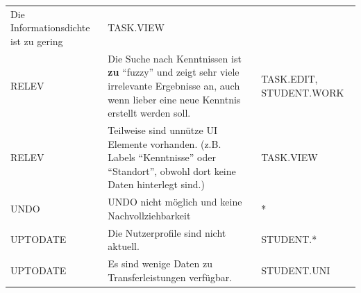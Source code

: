 \documentclass[
  12pt,
  ngerman,
  a4paper,
]{article}
\begin{document}
\begin{longtable}[]{@{}lll@{}}
\begin{minipage}[t]{0.55\columnwidth}
Die Informationsdichte ist zu gering\strut
\end{minipage} & \begin{minipage}[t]{0.23\columnwidth}\raggedright
TASK.VIEW\strut
\end{minipage}\tabularnewline
\begin{minipage}[t]{0.14\columnwidth}\raggedright
RELEV\strut
\end{minipage} & \begin{minipage}[t]{0.55\columnwidth}\raggedright
Die Suche nach Kenntnissen ist \textbf{zu} ``fuzzy'' und zeigt sehr
viele irrelevante Ergebnisse an, auch wenn lieber eine neue Kenntnis
erstellt werden soll.\strut
\end{minipage} & \begin{minipage}[t]{0.23\columnwidth}\raggedright
TASK.EDIT, STUDENT.WORK\strut
\end{minipage}\tabularnewline
\begin{minipage}[t]{0.14\columnwidth}\raggedright
RELEV\strut
\end{minipage} & \begin{minipage}[t]{0.55\columnwidth}\raggedright
Teilweise sind unnütze UI Elemente vorhanden. (z.B. Labels
``Kenntnisse'' oder ``Standort'', obwohl dort keine Daten hinterlegt
sind.)\strut
\end{minipage} & \begin{minipage}[t]{0.23\columnwidth}\raggedright
TASK.VIEW\strut
\end{minipage}\tabularnewline
\begin{minipage}[t]{0.14\columnwidth}\raggedright
UNDO\strut
\end{minipage} & \begin{minipage}[t]{0.55\columnwidth}\raggedright
UNDO nicht möglich und keine Nachvollziehbarkeit\strut
\end{minipage} & \begin{minipage}[t]{0.23\columnwidth}\raggedright
*\strut
\end{minipage}\tabularnewline
\begin{minipage}[t]{0.14\columnwidth}\raggedright
UPTODATE\strut
\end{minipage} & \begin{minipage}[t]{0.55\columnwidth}\raggedright
Die Nutzerprofile sind nicht aktuell.\strut
\end{minipage} & \begin{minipage}[t]{0.23\columnwidth}\raggedright
STUDENT.*\strut
\end{minipage}\tabularnewline
\begin{minipage}[t]{0.14\columnwidth}\raggedright
UPTODATE\strut
\end{minipage} & \begin{minipage}[t]{0.55\columnwidth}\raggedright
Es sind wenige Daten zu Transferleistungen verfügbar.\strut
\end{minipage} & \begin{minipage}[t]{0.23\columnwidth}\raggedright
STUDENT.UNI\strut
\end{minipage}\tabularnewline
\bottomrule
\end{longtable}
\end{document}
